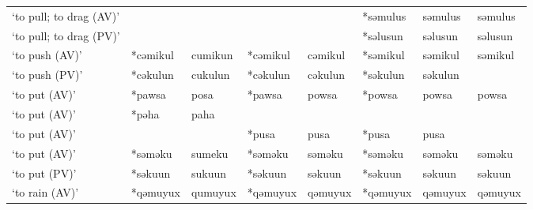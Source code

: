 \begin{landscape}
\begin{longtable}[c]{@{}p{3cm}<{\raggedright}p{2.75cm}<{\raggedright}p{2.75cm}<{\raggedright}p{2.75cm}<{\raggedright}p{2.75cm}<{\raggedright}p{2.75cm}<{\raggedright}p{2.75cm}<{\raggedright}p{2.75cm}<{\raggedright}@{}}
`to pull; to drag (AV)'                              &                    &                                &                    &                            & *səmulus         & səmulus                  & səmulus                           \\
`to pull; to drag (PV)'                              &                    &                                &                    &                            & *səlusun         & səlusun                  & səlusun                           \\
`to push (AV)'                                       & *cəmikul           & cumikun                        & *cəmikul           & cəmikul                    & *səmikul         & səmikul                  & səmikul                           \\
`to push (PV)'                                       & *cəkulun           & cukulun                        & *cəkulun           & cəkulun                    & *səkulun         & səkulun                  &                                   \\
`to put (AV)'                                        & *pawsa             & posa                           & *pawsa             & powsa                      & *powsa           & powsa                    & powsa                             \\
`to put (AV)'                                        & *pəha              & paha                           &                    &                            &                  &                          &                                   \\
`to put (AV)'                                        &                    &                                & *pusa              & pusa                       & *pusa            & pusa                     &                                   \\
`to put (AV)'                                        & *səməku            & sumeku                         & *səməku            & səməku                     & *səməku          & səməku                   & səməku                            \\
`to put (PV)'                                        & *səkuun            & sukuun                         & *səkuun            & səkuun                     & *səkuun          & səkuun                   & səkuun                            \\
`to rain (AV)'                                       & *qəmuyux           & qumuyux                        & *qəmuyux           & qəmuyux                    & *qəmuyux         & qəmuyux                  & qəmuyux                           \\

\end{longtable}
\end{landscape}
